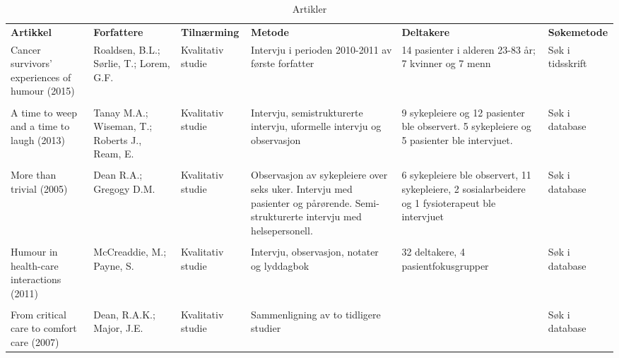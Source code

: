 \begin{landscape}
  \begin{table}
    \begin{tabularx}{\paperwidth}{XXlXXl}
      \textbf{Artikkel} &
      \textbf{Forfattere} &
      \textbf{Tilnærming} &
      \textbf{Metode} &
      \textbf{Deltakere} &
      \textbf{Søkemetode} \\
      Cancer survivors’ experiences of humour (2015) &
      Roaldsen, B.L.; S{\o}rlie, T.; Lorem, G.F. &
      Kvalitativ studie &
      Intervju i perioden 2010-2011 av første forfatter &
      14 pasienter i alderen 23-83 år; 7 kvinner og 7 menn &
      Søk i tidsskrift
      \\
      \\
      A time to weep and a time to laugh (2013) &
      Tanay M.A.; Wiseman, T.; Roberts J., Ream, E. &
      Kvalitativ studie &
      Intervju, semistrukturerte intervju, uformelle intervju og observasjon &
      9 sykepleiere og 12 pasienter ble observert. 5 sykepleiere og 5 pasienter ble intervjuet. &
      Søk i database
      \\
      \\
      More than trivial (2005) &
      Dean R.A.; Gregogy D.M. &
      Kvalitativ studie &
      Observasjon av sykepleiere over seks uker. Intervju med
      pasienter og pårørende. Semi-strukturerte intervju med helsepersonell. &
      6 sykepleiere ble observert, 11 sykepleiere, 2
      sosialarbeidere og 1 fysioterapeut ble intervjuet &
      Søk i database
      \\
      \\
      Humour in health-care interactions (2011) &
      McCreaddie, M.; Payne, S. &
      Kvalitativ studie &
      Intervju, observasjon, notater og lyddagbok &
      32 deltakere, 4 pasientfokusgrupper &
      Søk i database
      \\
      \\
      From critical care to comfort care (2007) &
      Dean, R.A.K.; Major, J.E. &
      Kvalitativ studie &
      Sammenligning av to tidligere studier &
      &
      Søk i database
    \end{tabularx}
    \label{tabell.artikler}
    \caption{Artikler}
  \end{table}
\end{landscape}
